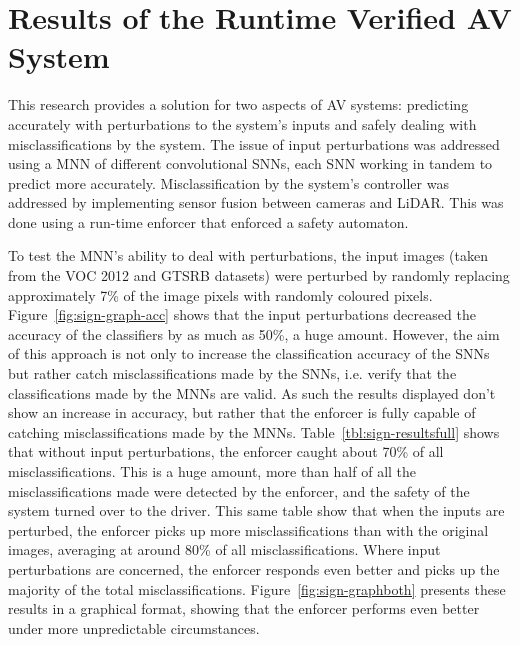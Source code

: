 \section{Results of the Runtime Verified AV System}

This research provides a solution for two aspects of \acf{AV} systems: predicting accurately with perturbations to the system's inputs and safely dealing with misclassifications by the system.
The issue of input perturbations was addressed using a \acf{MNN} of different convolutional \acfp{SNN}, each \ac{SNN} working in tandem to predict more accurately.
Misclassification by the system's controller was addressed by implementing sensor fusion between cameras and \ac{LiDAR}.
This was done using a run-time enforcer that enforced a safety automaton.

To test the \ac{MNN}'s ability to deal with perturbations, the input images (taken from the \ac{VOC} 2012 and \ac{GTSRB} datasets) were perturbed by randomly replacing approximately 7\% of the image pixels with randomly coloured pixels.
Figure~\ref{fig:sign-graph-acc} shows that the input perturbations decreased the accuracy of the classifiers by as much as 50\%, a huge amount.
However, the aim of this approach is not only to increase the classification accuracy of the \acp{SNN} but rather catch misclassifications made by the \acp{SNN}, i.e. verify that the classifications made by the \acp{MNN} are valid.
As such the results displayed don't show an increase in accuracy, but rather that the enforcer is fully capable of catching misclassifications made by the \acp{MNN}.
Table~\ref{tbl:sign-resultsfull} shows that without input perturbations, the enforcer caught about 70\% of all misclassifications. 
This is a huge amount, more than half of all the misclassifications made were detected by the enforcer, and the safety of the system turned over to the driver.
This same table show that when the inputs are perturbed, the enforcer picks up more misclassifications than with the original images, averaging at around 80\% of all misclassifications.
Where input perturbations are concerned, the enforcer responds even better and picks up the majority of the total misclassifications.
Figure~\ref{fig:sign-graphboth} presents these results in a graphical format, showing that the enforcer performs even better under more unpredictable circumstances.

